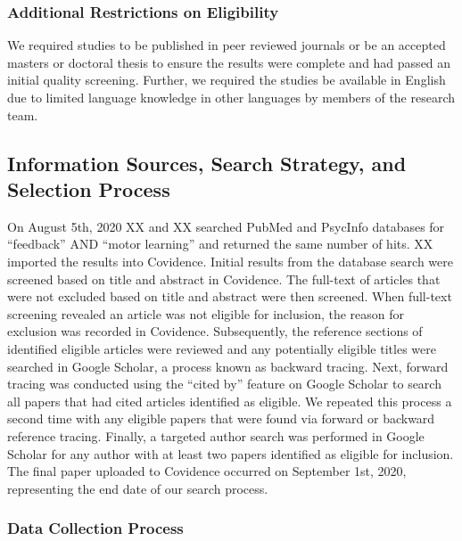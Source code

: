\documentclass[
  english,
  man,mask,floatsintext]{apa7}
\begin{document}
\hypertarget{additional-restrictions-on-eligibility}{%
\subsubsection{Additional Restrictions on Eligibility}\label{additional-restrictions-on-eligibility}}

We required studies to be published in peer reviewed journals or be an accepted masters or doctoral thesis to ensure the results were complete and had passed an initial quality screening. Further, we required the studies be available in English due to limited language knowledge in other languages by members of the research team.

\hypertarget{information-sources-search-strategy-and-selection-process}{%
\subsection{Information Sources, Search Strategy, and Selection Process}\label{information-sources-search-strategy-and-selection-process}}

On August 5th, 2020 XX and XX searched PubMed and PsycInfo databases for ``feedback'' AND ``motor learning'' and returned the same number of hits. XX imported the results into Covidence. Initial results from the database search were screened based on title and abstract in Covidence. The full-text of articles that were not excluded based on title and abstract were then screened. When full-text screening revealed an article was not eligible for inclusion, the reason for exclusion was recorded in Covidence. Subsequently, the reference sections of identified eligible articles were reviewed and any potentially eligible titles were searched in Google Scholar, a process known as backward tracing. Next, forward tracing was conducted using the ``cited by'' feature on Google Scholar to search all papers that had cited articles identified as eligible. We repeated this process a second time with any eligible papers that were found via forward or backward reference tracing. Finally, a targeted author search was performed in Google Scholar for any author with at least two papers identified as eligible for inclusion. The final paper uploaded to Covidence occurred on September 1st, 2020, representing the end date of our search process.

\hypertarget{data-collection-process}{%
\subsubsection{Data Collection Process}\label{data-collection-process}}
\end{document}
